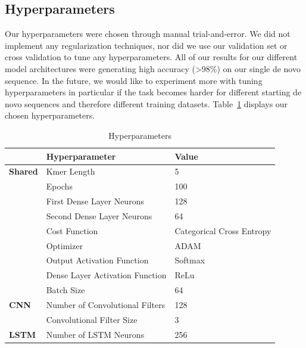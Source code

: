 \documentclass[journal]{IEEEtran}
\begin{document}
  \subsection{Hyperparameters}

    Our hyperparameters were chosen through manual trial-and-error. We did not implement
    any regularization techniques, nor did we use our validation set or cross validation to tune 
    any hyperparameters. All of our results for our different model architectures were generating
    high accuracy (>98\%) on our single de novo sequence. In the future, we would like to experiment
    more with tuning hyperparameters in particular if the task becomes harder for different starting
    de novo sequences and therefore different training datasets. Table~\ref{tab:hyperparameters}
    displays our chosen hyperparameters.

    \begin{table}[h!]
      \begin{center}
        \caption{Hyperparameters}
        \label{tab:hyperparameters}
        \begin{tabular}{l|l|l} %
          & \textbf{Hyperparameter} & \textbf{Value} \\
          \hline
          \textbf{Shared} & Kmer Length                      & 5 \\
                          & Epochs                           & 100 \\
                          & First Dense Layer Neurons        & 128 \\
                          & Second Dense Layer Neurons       & 64 \\
                          & Cost Function                    & Categorical Cross Entropy \\
                          & Optimizer                        & ADAM \\
                          & Output Activation Function       & Softmax \\
                          & Dense Layer Activation Function  & ReLu \\
                          & Batch Size                       & 64 \\
          \hline
          \textbf{CNN}    & Number of Convolutional Filters  & 128 \\
                          & Convolutional Filter Size        & 3 \\
          \hline
          \textbf{LSTM}   & Number of LSTM Neurons           & 256 \\
        \end{tabular}
      \end{center}
    \end{table}
\end{document}
